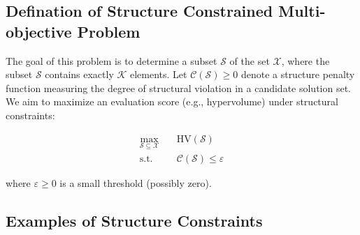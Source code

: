 \def\CTeXPreproc{Created by ctex v0.2.14, don't edit!}\documentclass[journal]{IEEEtran}
\begin{document}
\subsection*{Defination of Structure Constrained Multi-objective Problem}

The goal of this problem is to determine a subset $\mathcal{S}$ of the set $\mathcal{X}$, where the subset $\mathcal{S}$ contains exactly $\mathcal{K}$ elements. Let $\mathcal{C}(\mathcal{S}) \geq 0$ denote a structure penalty function measuring the degree of structural violation in a candidate solution set. We aim to maximize an evaluation score (e.g., hypervolume) under structural constraints:

\begin{equation}
\begin{aligned}
\max_{\mathcal{S} \subseteq \mathcal{X}} \quad & \text{HV}(\mathcal{S}) \\
\text{s.t.} \quad & \mathcal{C}(\mathcal{S}) \leq \varepsilon
\end{aligned}
\label{eq:score_problem}
\end{equation}

where $\varepsilon \geq 0$ is a small threshold (possibly zero). 

\subsection*{Examples of Structure Constraints}
\end{document}
